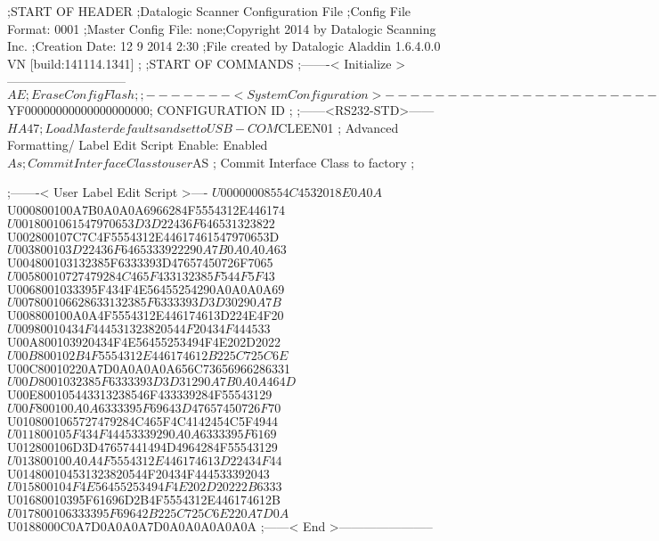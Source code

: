 ;START OF HEADER
;Datalogic Scanner Configuration File
;Config File Format: 0001
;Master Config File: none;Copyright 2014 by Datalogic Scanning Inc.
;Creation Date: 12 9 2014 2:30
;File created by Datalogic Aladdin 1.6.4.0.0 VN [build:141114.1341]
;
;START OF COMMANDS
;-------< Initialize >-----------------------------
$AE                 ; Erase Config Flash
;
;-------< System Configuration >-------------------------------
$YF00000000000000000000; CONFIGURATION ID
;
;------<RS232-STD>------
$HA47               ; Load Master defaults and set to USB-COM
$CLEEN01            ; Advanced Formatting/ Label Edit Script Enable: Enabled
$As                 ; Commit Interface Class to user
$AS                 ; Commit Interface Class to factory
;

;-------< User Label Edit Script >----
$U00000008554C4532018E0A0A
$U000800100A7B0A0A0A6966284F5554312E446174
$U0018001061547970653D3D22436F646531323822
$U002800107C7C4F5554312E44617461547970653D
$U003800103D22436F6465333922290A7B0A0A0A63
$U004800103132385F6333393D47657450726F7065
$U00580010727479284C465F433132385F544F5F43
$U0068001033395F434F4E56455254290A0A0A0A69
$U007800106628633132385F6333393D3D30290A7B
$U008800100A0A4F5554312E446174613D224E4F20
$U00980010434F444531323820544F20434F444533
$U00A800103920434F4E56455253494F4E202D2022
$U00B800102B4F5554312E446174612B225C725C6E
$U00C80010220A7D0A0A0A0A656C73656966286331
$U00D8001032385F6333393D3D31290A7B0A0A464D
$U00E800105443313238546F433339284F55543129
$U00F800100A0A6333395F69643D47657450726F70
$U0108001065727479284C465F4C4142454C5F4944
$U011800105F434F44453339290A0A6333395F6169
$U012800106D3D47657441494D4964284F55543129
$U013800100A0A4F5554312E446174613D22434F44
$U014800104531323820544F20434F444533392043
$U015800104F4E56455253494F4E202D20222B6333
$U01680010395F61696D2B4F5554312E446174612B
$U017800106333395F69642B225C725C6E220A7D0A
$U0188000C0A7D0A0A0A7D0A0A0A0A0A0A
;------< End >-----------------------
